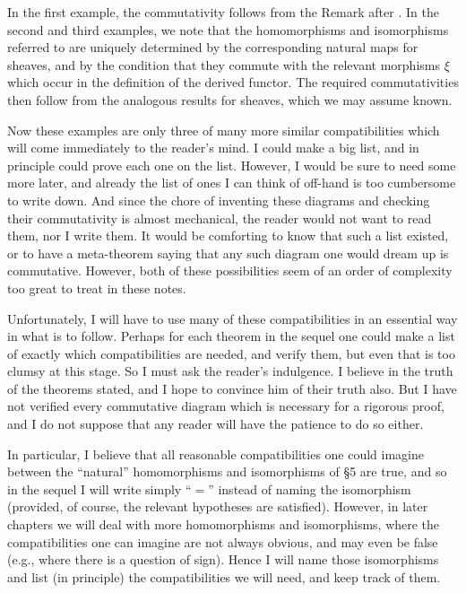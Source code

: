 In the first example, the commutativity follows from the Remark after . In the second and third examples, we note that the homomorphisms and isomorphisms referred to are uniquely determined by the corresponding natural maps for sheaves, and by the condition that they commute with the relevant morphisms $\xi$ which occur in the definition of the derived functor. The required commutativities then follow from the analogous results for sheaves, which we may assume known.

Now these examples are only three of many more similar compatibilities which will come immediately to the reader's mind. I could make a big list, and in principle could prove each one on the list. However, I would be sure to need some more later, and already the list of ones I can think of off-hand is too cumbersome to write down. And since the chore of inventing these diagrams and checking their commutativity is almost mechanical, the reader would not want to read them, nor I write them. It would be comforting to know that such a list existed, or to have a meta-theorem saying that any such diagram one would dream up is commutative. However, both of these possibilities seem of an order of complexity too great to treat in these notes.

Unfortunately, I will have to use many of these compatibilities in an essential way in what is to follow. Perhaps for each theorem in the sequel one could make a list of exactly which compatibilities are needed, and verify them, but even that is too clumsy at this stage. So I must ask the reader's indulgence. I believe in the truth of the theorems stated, and I hope to convince him of their truth also. But I have not verified every commutative diagram which is necessary for a rigorous proof, and I do not suppose that any reader will have the patience to do so either.

In particular, I believe that all reasonable compatibilities one could imagine between the ``natural'' homomorphisms and isomorphisms of \S5 are true, and so in the sequel I will write simply ``$=$'' instead of naming the isomorphism (provided, of course, the relevant hypotheses are satisfied). However, in later chapters we will deal with more homomorphisms and isomorphisms, where the compatibilities one can imagine are not always obvious, and may even be false (e.g., where there is a question of sign). Hence I will name those isomorphisms and list (in principle) the compatibilities we will need, and keep track of them.

